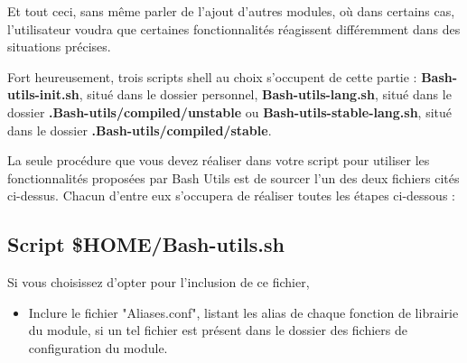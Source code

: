 \documentclass[a4paper,10pt]{article}
\begin{document}
    \begin{justify}
        Et tout ceci, sans même parler de l'ajout d'autres modules, où dans certains cas, l'utilisateur voudra que certaines fonctionnalités réagissent différemment dans des situations précises.
    \end{justify}

    \begin{justify}
        Fort heureusement, trois scripts shell au choix s'occupent de cette partie : \textbf{\color{path}Bash-utils-init.sh}, situé dans le dossier personnel, \textbf{\color{path}Bash-utils-lang.sh}, situé dans le dossier \textbf{\color{path}.Bash-utils/compiled/unstable} ou \textbf{\color{path}Bash-utils-stable-lang.sh}, situé dans le dossier \textbf{\color{path}.Bash-utils/compiled/stable}.
    \end{justify}

    \begin{justify}
        La seule procédure que vous devez réaliser dans votre script pour utiliser les fonctionnalités proposées par Bash Utils est de sourcer l'un des deux fichiers cités ci-dessus. Chacun d'entre eux s'occupera de réaliser toutes les étapes ci-dessous :
    \end{justify}




    \color{sec2}
    \subsection{Script \color{vars}\$HOME\color{path}/Bash-utils.sh}\color{text}

    \begin{justify}
        Si vous choisissez d'opter pour l'inclusion de ce fichier,
    \end{justify}

    \begin{justify}
        \begin{itemize}
            \item Inclure le fichier "Aliases.conf", listant les alias de chaque fonction de librairie du module, si un tel fichier est présent dans le dossier des fichiers de configuration du module.
        \end{itemize}
    \end{justify}
\end{document}
